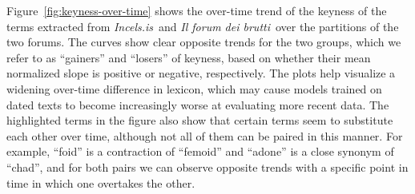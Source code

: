 \documentclass[11pt]{article}
\newcommand{\enforum}{\textit{Incels.is}}
\newcommand{\itforum}{\textit{Il forum dei brutti}}
\begin{document}




Figure~\ref{fig:keyness-over-time} shows the over-time trend of the keyness of the terms extracted from \enforum\, and \itforum\, over the partitions of the two forums. The curves show clear opposite trends for the two groups, which we refer to as ``gainers'' and ``losers'' of keyness, based on whether their mean normalized slope is positive or negative, respectively. The plots help visualize a widening over-time difference in lexicon, which may cause models trained on dated texts to become increasingly worse at evaluating more recent data. The highlighted terms in the figure also show that certain terms seem to substitute each other over time, although not all of them can be paired in this manner. For example, ``foid'' is a contraction of ``femoid'' and ``adone'' is a close synonym of ``chad'', and for both pairs we can observe opposite trends with a specific point in time in which one overtakes the other.
\end{document}
